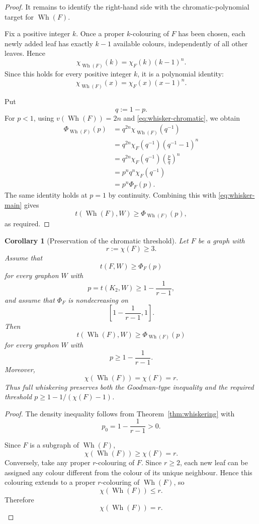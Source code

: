\documentclass[11pt]{article}
\newtheorem{corollary}[theorem]{Corollary}
\begin{document}
\begin{proof}
It remains to identify the right-hand side with the chromatic-polynomial
target for $\operatorname{Wh}(F)$.

Fix a positive integer $k$. Once a proper $k$-colouring of $F$ has
been chosen, each newly added leaf has exactly $k-1$ available colours,
independently of all other leaves. Hence
\[
    \chi_{\operatorname{Wh}(F)}(k)
    =
    \chi_F(k)(k-1)^n.
\]
Since this holds for every positive integer $k$, it is a polynomial
identity:
\begin{equation}\label{eq:whisker-chromatic}
    \chi_{\operatorname{Wh}(F)}(x)
    =
    \chi_F(x)(x-1)^n.
\end{equation}

Put
\[
    q:=1-p.
\]
For $p<1$, using
$v(\operatorname{Wh}(F))=2n$ and
\eqref{eq:whisker-chromatic}, we obtain
\[
\begin{aligned}
    \Phi_{\operatorname{Wh}(F)}(p)
    &=
    q^{2n}
    \chi_{\operatorname{Wh}(F)}(q^{-1})
    \\
    &=
    q^{2n}
    \chi_F(q^{-1})
    (q^{-1}-1)^n
    \\
    &=
    q^{2n}
    \chi_F(q^{-1})
    \left(\frac{p}{q}\right)^n
    \\
    &=
    p^n q^n \chi_F(q^{-1})
    \\
    &=
    p^n\Phi_F(p).
\end{aligned}
\]
The same identity holds at $p=1$ by continuity. Combining this with
\eqref{eq:whisker-main} gives
\[
    t(\operatorname{Wh}(F),W)
    \ge
    \Phi_{\operatorname{Wh}(F)}(p),
\]
as required.
\end{proof}

\begin{corollary}[Preservation of the chromatic threshold]
Let $F$ be a graph with
\[
    r:=\chi(F)\ge3.
\]
Assume that
\[
    t(F,W)\ge\Phi_F(p)
\]
for every graphon $W$ with
\[
    p=t(K_2,W)\ge 1-\frac1{r-1},
\]
and assume that $\Phi_F$ is nondecreasing on
\[
    \left[1-\frac1{r-1},1\right].
\]
Then
\[
    t(\operatorname{Wh}(F),W)
    \ge
    \Phi_{\operatorname{Wh}(F)}(p)
\]
for every graphon $W$ with
\[
    p\ge1-\frac1{r-1}.
\]
Moreover,
\[
    \chi(\operatorname{Wh}(F))=\chi(F)=r.
\]
Thus full whiskering preserves both the Goodman-type inequality and
the required threshold $p\ge1-1/(\chi(F)-1)$.
\end{corollary}

\begin{proof}
The density inequality follows from
Theorem~\ref{thm:whiskering} with
\[
    p_0=1-\frac1{r-1}>0.
\]

Since $F$ is a subgraph of $\operatorname{Wh}(F)$,
\[
    \chi(\operatorname{Wh}(F))\ge\chi(F)=r.
\]
Conversely, take any proper $r$-colouring of $F$. Since $r\ge2$, each
new leaf can be assigned any colour different from the colour of its
unique neighbour. Hence this colouring extends to a proper $r$-colouring
of $\operatorname{Wh}(F)$, so
\[
    \chi(\operatorname{Wh}(F))\le r.
\]
Therefore
\[
    \chi(\operatorname{Wh}(F))=r.
\]
\end{proof}
\end{document}
